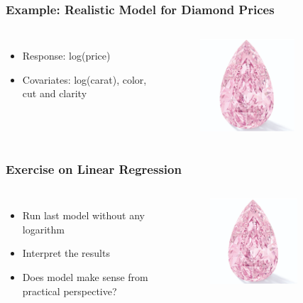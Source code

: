 \documentclass[
    utf8,
    aspectratio=169
]{beamer}  %
\begin{document}
\begin{frame}
\frametitle{Example: Realistic Model for Diamond Prices}
\begin{columns}
	\begin{itemize}
		\item Response: log(price)
		\item Covariates: log(carat), color, cut and clarity
	\end{itemize}
	\begin{figure}
		\includegraphics[width=0.7\textwidth]{pics/dia2.png}
	\end{figure}
\end{columns}
\end{frame}

\begin{frame}
\frametitle{Exercise on Linear Regression}
\begin{columns}
	\begin{itemize}
		\item Run last model without any logarithm
		\item Interpret the results
		\item Does model make sense from practical perspective?
	\end{itemize}
	\begin{figure}
		\includegraphics[width=0.7\textwidth]{pics/dia2.png}
	\end{figure}
\end{columns}
\end{frame}
\end{document}
